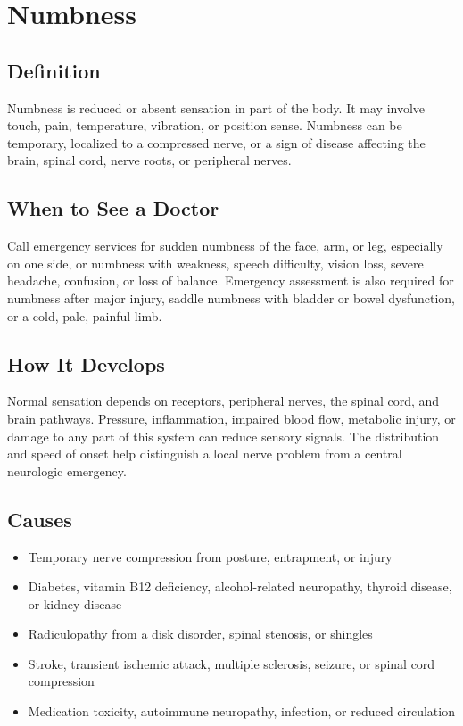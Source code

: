 \chapter{Numbness}

\section*{Definition}
Numbness is reduced or absent sensation in part of the body. It may involve touch, pain, temperature, vibration, or position sense. Numbness can be temporary, localized to a compressed nerve, or a sign of disease affecting the brain, spinal cord, nerve roots, or peripheral nerves.

\section*{When to See a Doctor}
Call emergency services for sudden numbness of the face, arm, or leg, especially on one side, or numbness with weakness, speech difficulty, vision loss, severe headache, confusion, or loss of balance. Emergency assessment is also required for numbness after major injury, saddle numbness with bladder or bowel dysfunction, or a cold, pale, painful limb.

\section*{How It Develops}
Normal sensation depends on receptors, peripheral nerves, the spinal cord, and brain pathways. Pressure, inflammation, impaired blood flow, metabolic injury, or damage to any part of this system can reduce sensory signals. The distribution and speed of onset help distinguish a local nerve problem from a central neurologic emergency.

\section*{Causes}
\begin{itemize}
  \item Temporary nerve compression from posture, entrapment, or injury
  \item Diabetes, vitamin B12 deficiency, alcohol-related neuropathy, thyroid disease, or kidney disease
  \item Radiculopathy from a disk disorder, spinal stenosis, or shingles
  \item Stroke, transient ischemic attack, multiple sclerosis, seizure, or spinal cord compression
  \item Medication toxicity, autoimmune neuropathy, infection, or reduced circulation
\end{itemize}

